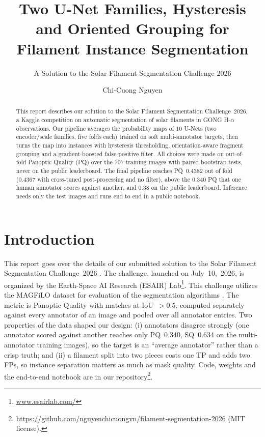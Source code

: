 \documentclass[sigconf]{acmart}
\newcommand{\pqoof}{0.4382}        %
\newcommand{\pqcross}{0.4367}      %
\begin{document}
\title{Two U-Net Families, Hysteresis and Oriented Grouping for Filament Instance Segmentation}
\subtitle{A Solution to the Solar Filament Segmentation Challenge 2026} %

\author{Chi-Cuong Nguyen}

\begin{abstract}
    This report describes our solution to the Solar Filament Segmentation Challenge~2026, a Kaggle competition on automatic segmentation of solar filaments in GONG H-$\alpha$ observations. Our pipeline averages the probability maps of 10 U-Nets (two encoder/scale families, five folds each) trained on soft multi-annotator targets, then turns the map into instances with hysteresis thresholding, orientation-aware fragment grouping and a gradient-boosted false-positive filter. All choices were made on out-of-fold Panoptic Quality (PQ) over the 707 training images with paired bootstrap tests, never on the public leaderboard. The final pipeline reaches PQ~\pqoof{} out of fold (\pqcross{} with cross-tuned post-processing and no filter), above the 0.340 PQ that one human annotator scores against another, and 0.38 on the public leaderboard. Inference needs only the test images and runs end to end in a public notebook.
\end{abstract}

\maketitle

\section{Introduction}
    This report goes over the details of our submitted solution to the Solar Filament Segmentation Challenge~2026 \cite{filament-segmentation-2026}. The challenge, launched on July~10,~2026, is organized by the Earth-Space AI Research (ESAIR) Lab\footnote{\href{https://www.esairlab.com/home}{www.esairlab.com/}}. This challenge utilizes the MAGFiLO dataset for evaluation of the segmentation algorithms \cite{ahmadzadeh2024dataset}. The metric is Panoptic Quality \cite{kirillov2019panoptic} with matches at IoU~$>0.5$, computed separately against every annotator of an image and pooled over all annotator entries. Two properties of the data shaped our design: (i) annotators disagree strongly (one annotator scored against another reaches only PQ~0.340, SQ~0.634 on the multi-annotator training images), so the target is an ``average annotator'' rather than a crisp truth; and (ii) a filament split into two pieces costs one TP and adds two FPs, so instance separation matters as much as mask quality. Code, weights and the end-to-end notebook are in our repository\footnote{\url{https://github.com/nguyenchicuongvn/filament-segmentation-2026} (MIT license).}.
\end{document}

